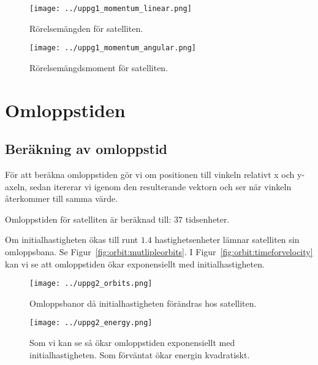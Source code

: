 \documentclass[a4]{article}
\begin{document}
\begin{figure}
\begin{center}
	\texttt{[image: ../uppg1\_momentum\_linear.png]}
\end{center}
\caption{Rörelsemängden för satelliten.}
\label{fig:satellite:linearmomentum}
\end{figure}

\begin{figure}
\begin{center}
	\texttt{[image: ../uppg1\_momentum\_angular.png]}
\end{center}
\caption{Rörelsemängdsmoment för satelliten.}
\label{fig:satellite:angularmomentum}
\end{figure}


\section{Omloppstiden}
	\subsection{Beräkning av omloppstid}
För att beräkna omloppstiden gör vi om positionen till vinkeln relativt x och
y-axeln, sedan itererar vi igenom den resulterande vektorn och ser när vinkeln
återkommer till samma värde.

Omloppstiden för satelliten är beräknad till: $37$ tidsenheter.

Om initialhastigheten ökas till runt $1.4$ hastighetsenheter lämnar satelliten sin omloppsbana.
Se Figur~\vref{fig:orbit:mutlipleorbits}.
I Figur~\vref{fig:orbit:timeforvelocity} kan vi se att omloppstiden ökar exponensiellt
med initialhastigheten.

\begin{figure}
\begin{center}
	\texttt{[image: ../uppg2\_orbits.png]}
\end{center}
\caption{
Omloppsbanor då initialhastigheten förändras hos satelliten.
}
\label{fig:orbit:mutlipleorbits}
\end{figure}

\begin{figure}
\begin{center}
	\texttt{[image: ../uppg2\_energy.png]}
\end{center}
\caption{
Som vi kan se så ökar omloppstiden exponensiellt med initialhastigheten.
Som förväntat ökar energin kvadratiskt.
}
\label{fig:orbit:timeforvelocity}
\end{figure}
\end{document}
